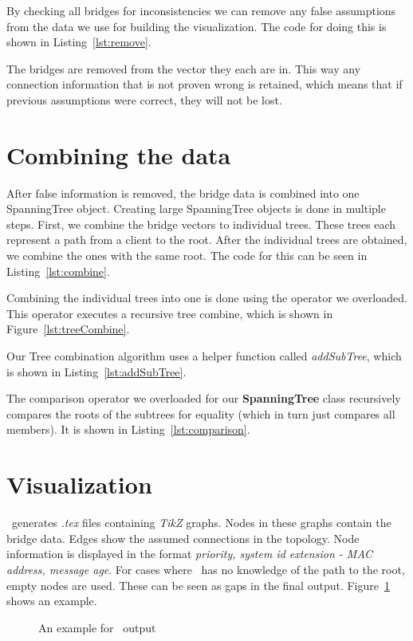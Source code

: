 By checking all bridges for inconsistencies we can remove any false assumptions from the data we use for building the visualization.
The code for doing this is shown in Listing~\ref{lst:remove}.

The bridges are removed from the vector they each are in.
This way any connection information that is not proven wrong is retained, which means that if previous assumptions were correct, they will not be lost.

\section{Combining the data}
\label{combining_data}
After false information is removed, the bridge data is combined into one SpanningTree object.
Creating large SpanningTree objects is done in multiple steps.
First, we combine the bridge vectors to individual trees.
These trees each represent a path from a client to the root.
After the individual trees are obtained, we combine the ones with the same root.
The code for this can be seen in Listing~\ref{lst:combine}.


Combining the individual trees into one is done using the operator we overloaded.
This operator executes a recursive tree combine, which is shown in Figure~\ref{lst:treeCombine}.


Our Tree combination algorithm uses a helper function called \textit{addSubTree}, which is shown in Listing~\ref{lst:addSubTree}.


The comparison operator we overloaded for our \textbf{SpanningTree} class recursively compares the roots of the subtrees for equality (which in turn just compares all members).
It is shown in Listing~\ref{lst:comparison}.


\section{Visualization}
\tool\ generates \textit{.tex} files containing \textit{TikZ} graphs.
Nodes in these graphs contain the bridge data.
Edges show the assumed connections in the topology.
Node information is displayed in the format \textit{priority, system id extension - MAC address, message age}.
For cases where \tool\ has no knowledge of the path to the root, empty nodes are used.
These can be seen as gaps in the final output.
Figure~\ref{fig:viz_example} shows an example.
\begin{figure}[h]
    \centering
    
    \caption{An example for \tool\ output}
    \label{fig:viz_example}
\end{figure}

